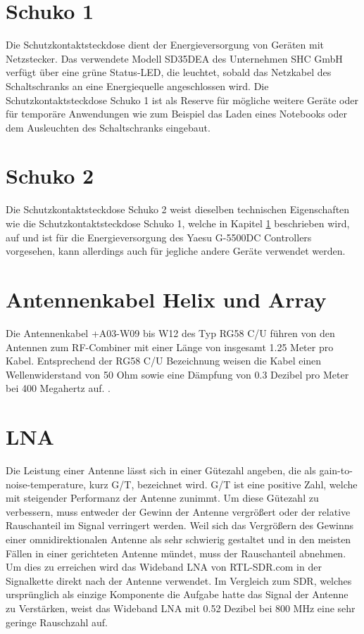 \section{Schuko 1}
\label{sec:schuko1}
Die Schutzkontaktsteckdose dient der Energieversorgung von Geräten mit Netzstecker. Das verwendete Modell SD35DEA des Unternehmen SHC GmbH verfügt über eine grüne Status-LED, die leuchtet, sobald das Netzkabel des Schaltschranks an eine Energiequelle angeschlossen wird. Die Schutzkontaktsteckdose Schuko 1 ist als Reserve für mögliche weitere Geräte oder für temporäre Anwendungen wie zum Beispiel das Laden eines Notebooks oder dem Ausleuchten des Schaltschranks eingebaut.

\section{Schuko 2}
\label{sec:schuko2}
Die Schutzkontaktsteckdose Schuko 2 weist dieselben technischen Eigenschaften wie die Schutzkontaktsteckdose Schuko 1, welche in Kapitel \ref{sec:schuko1} beschrieben wird, auf und ist für die Energieversorgung des Yaesu G-5500DC Controllers vorgesehen, kann allerdings auch für jegliche andere Geräte verwendet werden.

\section{Antennenkabel Helix und Array}
\label{sec:Antennenkabel-Helix}
Die Antennenkabel +A03-W09 bis W12 des Typ RG58 C/U führen von den Antennen zum RF-Combiner mit einer Länge von insgesamt 1.25 Meter pro Kabel. Entsprechend der RG58 C/U Bezeichnung weisen die Kabel einen Wellenwiderstand von 50 Ohm \cite{noauthor_rg_nodate} sowie eine Dämpfung von 0.3 Dezibel pro Meter bei 400 Megahertz auf. \cite{noauthor_vergleich_nodate}. 

\section{LNA}
\label{sec:LNA}
Die Leistung einer Antenne lässt sich in einer Gütezahl angeben, die als gain-to-noise-temperature, kurz G/T, bezeichnet wird. G/T ist eine positive Zahl, welche mit steigender Performanz der Antenne zunimmt. Um diese Gütezahl zu verbessern, muss entweder der Gewinn der Antenne vergrößert oder der relative Rauschanteil im Signal verringert werden. Weil sich das Vergrößern des Gewinns einer omnidirektionalen Antenne als sehr schwierig gestaltet und in den meisten Fällen in einer gerichteten Antenne mündet, muss der Rauschanteil abnehmen. Um dies zu erreichen wird das Wideband LNA von RTL-SDR.com in der Signalkette direkt nach der Antenne verwendet. Im Vergleich zum SDR, welches ursprünglich als einzige Komponente die Aufgabe hatte das Signal der Antenne zu Verstärken, weist das Wideband LNA mit 0.52 Dezibel bei 800 MHz eine sehr geringe Rauschzahl auf. \cite{noauthor_new_nodate} \cite{noauthor_omnidirectional_nodate}


